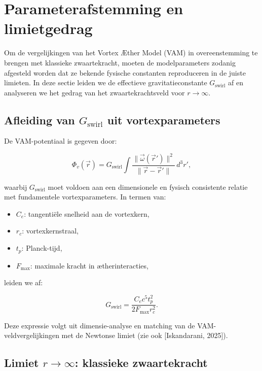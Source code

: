 \section{Parameterafstemming en limietgedrag}

Om de vergelijkingen van het Vortex Æther Model (VAM) in overeenstemming te brengen met klassieke zwaartekracht, moeten de modelparameters zodanig afgesteld worden dat ze bekende fysische constanten reproduceren in de juiste limieten. In deze sectie leiden we de effectieve gravitatieconstante $G_{\text{swirl}}$ af en analyseren we het gedrag van het zwaartekrachtsveld voor $r \to \infty$.

\subsection{Afleiding van $G_{\text{swirl}}$ uit vortexparameters}

De VAM-potentiaal is gegeven door:

\begin{equation}
\Phi_v(\vec{r}) = G_{\text{swirl}} \int \frac{\|\vec{\omega}(\vec{r}')\|^2}{\|\vec{r} - \vec{r}'\|} \, d^3r',
\end{equation}

waarbij $G_{\text{swirl}}$ moet voldoen aan een dimensionele en fysisch consistente relatie met fundamentele vortexparameters. In termen van:

\begin{itemize}
  \item $C_e$: tangentiële snelheid aan de vortexkern,
  \item $r_c$: vortexkernstraal,
  \item $t_p$: Planck-tijd,
  \item $F_{\text{max}}$: maximale kracht in ætherinteracties,
\end{itemize}

leiden we af:

\begin{equation}
G_{\text{swirl}} = \frac{C_e c^5 t_p^2}{2 F_{\text{max}} r_c^2}.
\end{equation}

Deze expressie volgt uit dimensie-analyse en matching van de VAM-veldvergelijkingen met de Newtonse limiet (zie ook [Iskandarani, 2025]).

\subsection{Limiet $r \to \infty$: klassieke zwaartekracht}

